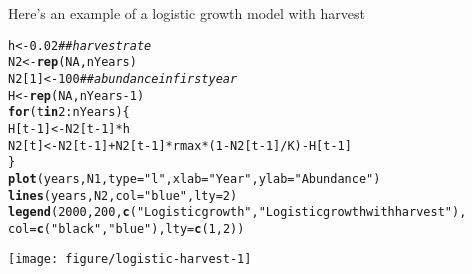 \documentclass[12pt]{article}\usepackage[]{graphicx}\usepackage[]{color}
\makeatletter
\newcommand{\hlnum}[1]{\textcolor[rgb]{0.686,0.059,0.569}{#1}}%
\newcommand{\hlstr}[1]{\textcolor[rgb]{0.192,0.494,0.8}{#1}}%
\newcommand{\hlcom}[1]{\textcolor[rgb]{0.678,0.584,0.686}{\textit{#1}}}%
\newcommand{\hlopt}[1]{\textcolor[rgb]{0,0,0}{#1}}%
\newcommand{\hlstd}[1]{\textcolor[rgb]{0.345,0.345,0.345}{#1}}%
\newcommand{\hlkwa}[1]{\textcolor[rgb]{0.161,0.373,0.58}{\textbf{#1}}}%
\newcommand{\hlkwb}[1]{\textcolor[rgb]{0.69,0.353,0.396}{#1}}%
\newcommand{\hlkwc}[1]{\textcolor[rgb]{0.333,0.667,0.333}{#1}}%
\newcommand{\hlkwd}[1]{\textcolor[rgb]{0.737,0.353,0.396}{\textbf{#1}}}%
\newenvironment{kframe}{%
 \def\at@end@of@kframe{}%
 \ifinner\ifhmode%
  \def\at@end@of@kframe{\end{minipage}}%
  \begin{minipage}{\columnwidth}%
 \fi\fi%
 \def\FrameCommand##1{\hskip\@totalleftmargin \hskip-\fboxsep
 \colorbox{shadecolor}{##1}\hskip-\fboxsep
     \hskip-\linewidth \hskip-\@totalleftmargin \hskip\columnwidth}%
 \MakeFramed {\advance\hsize-\width
   \@totalleftmargin\z@ \linewidth\hsize
   \@setminipage}}%
 {\par\unskip\endMakeFramed%
 \at@end@of@kframe}
\newenvironment{knitrout}{}{} %
\makeatother
\begin{document}
Here's an example of a logistic growth model with harvest
\begin{knitrout}\small
{}\color{fgcolor}\begin{kframe}
\begin{alltt}
\hlstd{h} \hlkwb{<-} \hlnum{0.02}                \hlcom{## harvest rate}
\hlstd{N2} \hlkwb{<-} \hlkwd{rep}\hlstd{(}\hlnum{NA}\hlstd{, nYears)}
\hlstd{N2[}\hlnum{1}\hlstd{]} \hlkwb{<-} \hlnum{100}             \hlcom{## abundance in first year}
\hlstd{H} \hlkwb{<-} \hlkwd{rep}\hlstd{(}\hlnum{NA}\hlstd{, nYears}\hlopt{-}\hlnum{1}\hlstd{)}
\hlkwa{for}\hlstd{(t} \hlkwa{in} \hlnum{2}\hlopt{:}\hlstd{nYears) \{}
    \hlstd{H[t}\hlopt{-}\hlnum{1}\hlstd{]} \hlkwb{<-} \hlstd{N2[t}\hlopt{-}\hlnum{1}\hlstd{]}\hlopt{*}\hlstd{h}
    \hlstd{N2[t]} \hlkwb{<-} \hlstd{N2[t}\hlopt{-}\hlnum{1}\hlstd{]} \hlopt{+} \hlstd{N2[t}\hlopt{-}\hlnum{1}\hlstd{]}\hlopt{*}\hlstd{rmax}\hlopt{*}\hlstd{(}\hlnum{1} \hlopt{-} \hlstd{N2[t}\hlopt{-}\hlnum{1}\hlstd{]}\hlopt{/}\hlstd{K)} \hlopt{-} \hlstd{H[t}\hlopt{-}\hlnum{1}\hlstd{]}
\hlstd{\}}
\hlkwd{plot}\hlstd{(years, N1,} \hlkwc{type}\hlstd{=}\hlstr{"l"}\hlstd{,} \hlkwc{xlab}\hlstd{=}\hlstr{"Year"}\hlstd{,} \hlkwc{ylab}\hlstd{=}\hlstr{"Abundance"}\hlstd{)}
\hlkwd{lines}\hlstd{(years, N2,} \hlkwc{col}\hlstd{=}\hlstr{"blue"}\hlstd{,} \hlkwc{lty}\hlstd{=}\hlnum{2}\hlstd{)}
\hlkwd{legend}\hlstd{(}\hlnum{2000}\hlstd{,} \hlnum{200}\hlstd{,} \hlkwd{c}\hlstd{(}\hlstr{"Logistic growth"}\hlstd{,} \hlstr{"Logistic growth with harvest"}\hlstd{),}
       \hlkwc{col}\hlstd{=}\hlkwd{c}\hlstd{(}\hlstr{"black"}\hlstd{,} \hlstr{"blue"}\hlstd{),} \hlkwc{lty}\hlstd{=}\hlkwd{c}\hlstd{(}\hlnum{1}\hlstd{,}\hlnum{2}\hlstd{))}
\end{alltt}
\end{kframe}

{\centering \texttt{[image: figure/logistic-harvest-1]} 

}



\end{knitrout}
\end{document}
